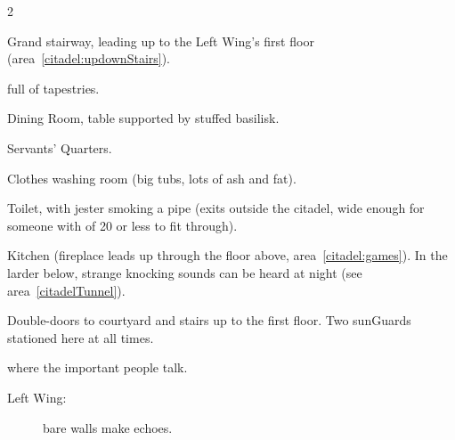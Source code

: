 \begin{multicols}{2}
\begin{description}
\begin{description}
\begin{dlist}
        \item
        Grand stairway, leading up to the Left Wing's first floor (\gls{area}~\ref{citadel:updownStairs}).
      \end{dlist}
      \item[Right Wing:]
      full of tapestries.
      \begin{dlist}
        \item
        Dining Room, table supported by stuffed \gls{basilisk}.
        \item
        Servants' Quarters.
        \item
        Clothes washing room (big tubs, lots of ash and fat).
        \item
        Toilet, with jester smoking a pipe (exits outside the citadel, wide enough for someone with  of 20 or less to fit through).
        \item
        Kitchen (fireplace leads up through the floor above, \gls{area}~\vref{citadel:games}).
        In the larder below, strange knocking sounds can be heard at night (see \gls{area}~\vref{citadelTunnel}).
        \label{citadel:kitchen}
        \item
        Double-doors to courtyard and stairs up to the first floor.
        Two \glspl{sunGuard} stationed here at all times.
        \label{citadel:entrance}
      \end{dlist}
    \end{description}
  \item[First Floor:]
  where the important people talk.
    \begin{description}
      \item[Left Wing:]
      bare walls make echoes.

\end{description}
\end{description}
\end{multicols}
